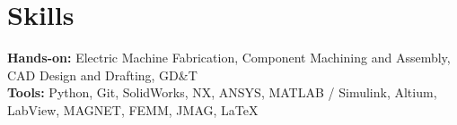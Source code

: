 \section{\sc Skills}

\textbf{Hands-on:} Electric Machine Fabrication, Component Machining and Assembly, CAD Design and Drafting, GD\&T\\
\textbf{Tools:} Python, Git, SolidWorks, NX, ANSYS, MATLAB / Simulink, Altium, LabView, MAGNET, FEMM, JMAG, \LaTeX

\endinput
